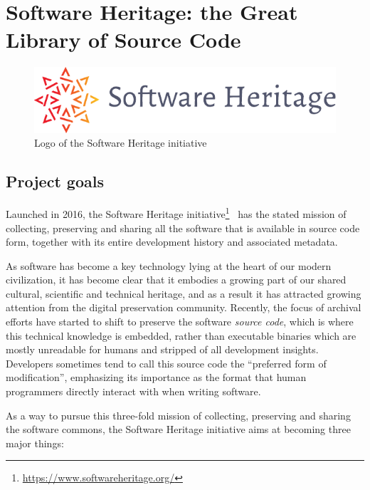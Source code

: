 \chapter{Software Heritage: the Great Library of Source Code}

\begin{figure}
    \centering
    \includegraphics[width=0.5\linewidth]{img/SWH-logo}
    \caption{Logo of the Software Heritage initiative}
\end{figure}

\section{Project goals}

Launched in 2016, the Software Heritage
initiative\footnote{\url{https://www.softwareheritage.org/}}~\cite{swhcacm2018}
has the stated mission of collecting, preserving and sharing all the software
that is available in source code form, together with its entire development
history and associated metadata.

As software has become a key technology lying at the heart of our modern
civilization, it has become clear that it embodies a growing part of our shared
cultural, scientific and technical heritage, and as a result it has attracted
growing attention from the digital preservation community.
Recently, the focus of archival efforts have started to shift to preserve the
software \emph{source code}, which is where this technical knowledge is
embedded, rather than executable binaries which are mostly unreadable for
humans and stripped of all development insights. Developers sometimes tend to
call this source code the ``preferred form of modification'', emphasizing its
importance as the format that human programmers directly interact with when
writing software.

As a way to pursue this three-fold mission of collecting, preserving and
sharing the software commons, the Software Heritage initiative aims at becoming
three major things:

